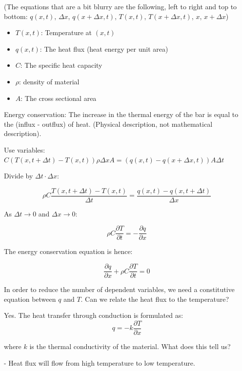 \documentclass{article}
\begin{document}
\hfill

(The equations that are a bit blurry are the following, left to right and top to bottom: $q(x,t)$, $\Delta x$, $q(x + \Delta x, t)$, $T(x,t)$, $T(x + \Delta x, t)$, $x$, $x + \Delta x$)
\begin{itemize}
    \item $T(x,t)$: Temperature at $(x,t)$
    \item $q(x,t)$: The heat flux (heat energy per unit area)
    \item $C$: The specific heat capacity
    \item $\rho$: density of material
    \item $A$: The cross sectional area
\end{itemize}


Energy conservation: The increase in the thermal energy of the bar is equal to the (influx - outflux) of heat.  (Physical description, not mathematical description). 

Use variables: $C (T(x,t + \Delta t) - T(x,t)) \rho \Delta x A = (q (x,t) - q(x + \Delta x, t)) A \Delta t$

Divide by $\Delta t \cdot \Delta x$: 

$$\rho C \frac{T(x,t + \Delta t) - T(x,t)}{\Delta t} = \frac{q(x,t) - q(x,t + \Delta t)}{\Delta x}$$

As $\Delta t \to 0$ and $\Delta x \to 0$:

$$\rho C \frac{\partial T}{\partial t} = - \frac{\partial q}{\partial x}$$

The energy conservation equation is hence:

\begin{equation}
\label{energy conservation equation}
    \frac{\partial q}{\partial x} + \rho C \frac{\partial T}{\partial t} = 0
\end{equation}

In order to reduce the number of dependent variables, we need a constitutive equation between $q$ and $T$. Can we relate the heat flux to the temperature?

Yes. The heat transfer through conduction is formulated as:
\begin{equation}
\label{Fourier's Law}
\tag{Fourier's Law}
    q = -k \frac{\partial T}{\partial x}
\end{equation}

where $k$ is the thermal conductivity of the material. What does this tell us?

- Heat flux will flow from high temperature to low temperature. 
\end{document}
